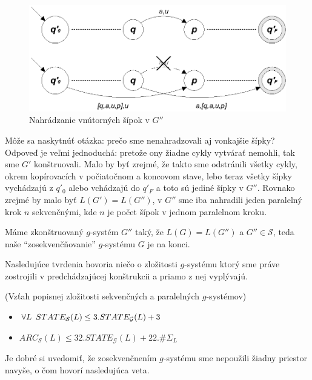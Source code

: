 \begin{dokaz}
\begin{enumerate}
    \begin{figure}[!ht]
      \centering
      \includegraphics{img/gsystems/g_s_p_2}
      \caption{Nahrádzanie vnútorných šípok v $G''$} \label{gs_obr_gps2}
    \end{figure}

    Môže sa naskytnúť otázka: prečo sme nenahradzovali aj vonkajšie
    šípky? Odpoveď je veľmi jednoduchá: pretože ony žiadne cykly
    vytvárať nemohli, tak sme $G'$ konštruovali. Malo by byť zrejmé,
    že takto sme odstránili všetky cykly, okrem kopírovacích v
    počiatočnom a koncovom stave, lebo teraz všetky šípky vychádzajú z
    $q'_0$ alebo vchádzajú do $q'_F$ a toto sú jediné šípky v $G''$.
    Rovnako zrejmé by malo byť $L(G')=L(G'')$, v $G''$ sme iba
    nahradili jeden paralelný krok $n$ sekvenčnými, kde $n$ je počet
    šípok v jednom paralelnom kroku.
  \end{enumerate}
  Máme zkonštruovaný $g$-systém $G''$ taký, že $L(G)=L(G'')$ a
  $G''\in\mathcal{S}$, teda naše ``zosekvenčňovanie'' $g$-systému
  $G$ je na konci.
\end{dokaz}

Nasledujúce tvrdenia hovoria niečo o zložitosti $g$-systému ktorý
sme práve zostrojili v pred\-chá\-dza\-jú\-cej konštrukcii a
priamo z nej vyplývajú.

\begin{veta}
  (Vzťah popisnej zložitosti sekvenčných a paralelných $g$-systémov)
  \begin{itemize}
    \item $\forall L\enspace STATE_{\mathcal{S}}(L)\leq
      3.STATE_{\mathcal{G}}(L)+3$
    \item $ARC_{\mathcal{S}}(L)\leq 32.STATE_{\mathcal{G}}(L)+22.\#\Sigma_L$
  \end{itemize}
\end{veta}

Je dobré si uvedomiť, že zosekvenčnením $g$-systému sme nepoužili
žiadny priestor navyše, o čom hovorí nasledujúca veta.

